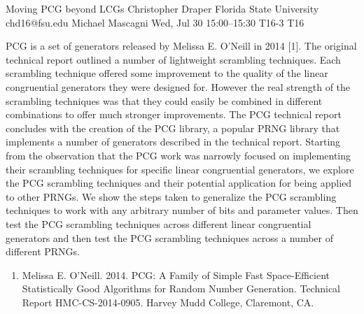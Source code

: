 \begin{talk}
  {Moving PCG beyond LCGs}%
  {Christopher Draper}%
  {Florida State University}%
  {chd16@fsu.edu}%
  {Michael Mascagni}%
  {}%
  {Wed, Jul 30 15:00--15:30}%
  {T16-3}%
  {T16}%
  
    
   
PCG is a set of generators released by Melissa E. O’Neill in 2014 [1]. The original technical report outlined a number of lightweight
scrambling techniques. Each scrambling technique offered some improvement to the quality of the linear congruential generators
they were designed for. However the real strength of the scrambling techniques was that they could easily be combined in different
combinations to offer much stronger improvements. The PCG technical report concludes with the creation of the PCG library, a
popular PRNG library that implements a number of generators described in the technical report. Starting from the observation that the
PCG work was narrowly focused on implementing their scrambling techniques for specific linear congruential generators, we explore
the PCG scrambling techniques and their potential application for being applied to other PRNGs. We show the steps taken to generalize the PCG
scrambling techniques to work with any arbitrary number of bits and parameter values. Then test the PCG scrambling techniques
across different linear congruential generators and then test the PCG scrambling techniques across a number of different PRNGs.
\medskip

\begin{enumerate}
 \item[{[1]}] Melissa E. O’Neill. 2014. PCG: A Family of Simple Fast Space-Efficient Statistically Good Algorithms for Random Number Generation. Technical Report HMC-CS-2014-0905. Harvey Mudd College, Claremont, CA.
\end{enumerate}

\end{talk}

